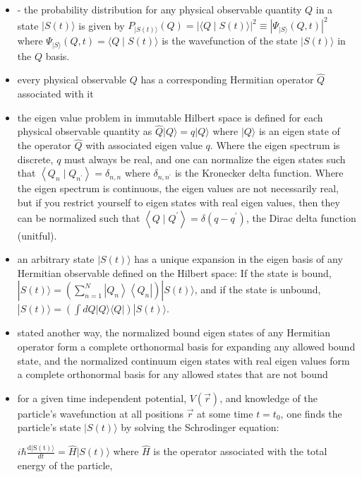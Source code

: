 \documentclass{article}
\begin{document}
\begin{itemize}
    \item - the probability distribution for any physical observable quantity $Q$ in a state $|S(t)\rangle$ is given by $P_{|S(t)\rangle}(Q)=|\langle Q \mid S(t)\rangle|^{2} \equiv\left|\Psi_{|S\rangle}(Q, t)\right|^{2}$ where $\Psi_{|S\rangle}(Q, t)=\langle Q \mid S(t)\rangle$ is the wavefunction of the state $|S(t)\rangle$ in the $Q$ basis.
    \item every physical observable $Q$ has a corresponding Hermitian operator $\hat{Q}$ associated with it
    \item the eigen value problem in immutable Hilbert space is defined for each physical observable quantity as $\hat{Q}|Q\rangle=q|Q\rangle$ where $|Q\rangle$ is an eigen state of the operator $\hat{Q}$ with associated eigen value $q$. Where the eigen spectrum is discrete, $q$ must always be real, and one can normalize the eigen states such that $\left\langle Q_{n} \mid Q_{n^{\prime}}\right\rangle=\delta_{n, n}$ where $\delta_{n, n^{\prime}}$ is the Kronecker delta function. Where the eigen spectrum is continuous, the eigen values are not necessarily real, but if you restrict yourself to eigen states with real eigen values, then they can be normalized such that $\left\langle Q \mid Q^{\prime}\right\rangle=\delta\left(q-q^{\prime}\right)$, the Dirac delta function (unitful).
    \item an arbitrary state $|S(t)\rangle$ has a unique expansion in the eigen basis of any Hermitian observable defined on the Hilbert space: If the state is bound, $|S(t)\rangle=\left(\sum_{n=1}^{N}\left|Q_{n}\right\rangle\left\langle Q_{n}\right|\right)|S(t)\rangle$, and if the state is unbound, $|S(t)\rangle=\left(\int d Q|Q\rangle\langle Q|\right)|S(t)\rangle$.
    \item stated another way, the normalized bound eigen states of any Hermitian operator form a complete orthonormal basis for expanding any allowed bound state, and the normalized continuum eigen states with real eigen values form a complete orthonormal basis for any allowed states that are not bound
    \item for a given time independent potential, $V(\vec{r})$, and knowledge of the particle's wavefunction at all positions $\vec{r}$ at some time $t=t_{0}$, one finds the particle's state $|S(t)\rangle$ by solving the Schrodinger equation:
    
$i \hbar \frac{\mathrm{d}|\mathrm{S}(\mathrm{t})\rangle}{d t}=\widehat{H}|S(t)\rangle$ where $\widehat{H}$ is the operator associated with the total energy of the particle,


\end{itemize}
\end{document}
